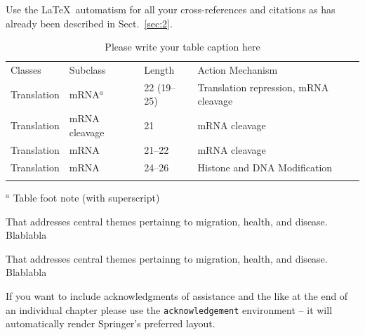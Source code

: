 \documentclass[graybox]{svmult}
\begin{document}
 Use the \LaTeX\ automatism for all your cross-refer\-ences and citations as has already been described in Sect.~\ref{sec:2}.
%
\begin{table}
\caption{Please write your table caption here}
\label{tab:1}       %
%
%
\begin{tabular}{p{2cm}p{2.4cm}p{2cm}p{4.9cm}}
\hline\noalign{\smallskip}
Classes & Subclass & Length & Action Mechanism  \\
\noalign{\smallskip}\svhline\noalign{\smallskip}
Translation & mRNA$^a$  & 22 (19--25) & Translation repression, mRNA cleavage\\
Translation & mRNA cleavage & 21 & mRNA cleavage\\
Translation & mRNA  & 21--22 & mRNA cleavage\\
Translation & mRNA  & 24--26 & Histone and DNA Modification\\
\noalign{\smallskip}\hline\noalign{\smallskip}
\end{tabular}
$^a$ Table foot note (with superscript)
\end{table}

\begin{description}[Type 1]
\item[Type 1]{That addresses central themes pertainng to migration, health, and disease. Blablabla}
\item[Type 2]{That addresses central themes pertainng to migration, health, and disease. Blablabla}
\end{description}





\begin{acknowledgement}
If you want to include acknowledgments of assistance and the like at the end of an individual chapter please use the \verb|acknowledgement| environment -- it will automatically render Springer's preferred layout.
\end{acknowledgement}
%
%



\end{document}
